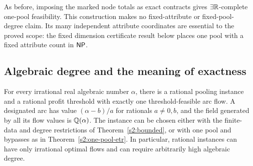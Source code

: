 As before, imposing the marked node totals as exact contracts gives
$\exists\mathbb R$-complete one-pool feasibility. This construction makes no
fixed-attribute or fixed-pool-degree claim. Its many independent
attribute coordinates are essential to the proved scope: the fixed
dimension certificate result below places one pool with a fixed
attribute count in $\mathsf{NP}$.

\subsection{Algebraic degree and the meaning of exactness}\label{s2:degree}

\begin{theorem}\label{s2:algebraic-witness}
For every irrational real algebraic number $\alpha$, there is a rational
pooling instance and a rational profit threshold with exactly one
threshold-feasible arc flow. A designated arc has value
$(\alpha-b)/a$ for rationals $a\ne0,b$, and the field generated by
all its flow values is $\mathbb Q(\alpha)$. The instance can be chosen either
with the finite-data and degree restrictions of Theorem~\ref{s2:bounded},
or with one pool and bypasses as in Theorem~\ref{s2:one-pool-etr}.
In particular, rational instances can have only irrational optimal flows
and can require arbitrarily high algebraic degree.
\end{theorem}
